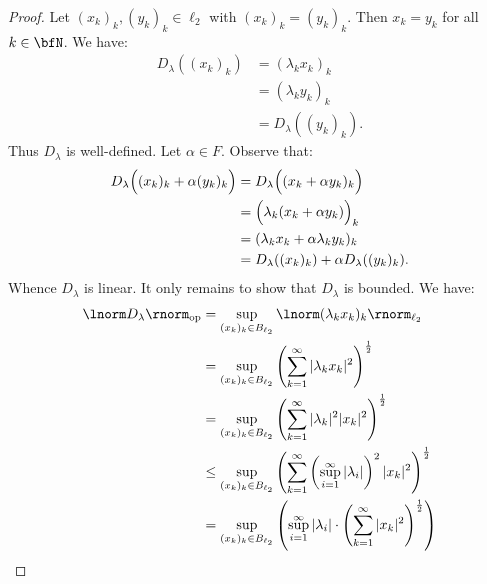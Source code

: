\documentclass[11pt,twoside,openany]{memoir}
\begin{document}
        \begin{proof}
            Let $(x_k)_k,(y_k)_k \in \ell_2$ with $(x_k)_k = (y_k)_k$. Then $x_k = y_k$ for all $k \in \bfN$. We have:
                \begin{equation*}
                \begin{split}
                    D_\lambda((x_k)_k)
                    & = (\lambda_k x_k)_k \\
                    & = (\lambda_k y_k)_k \\
                    & = D_\lambda((y_k)_k).
                \end{split}
                \end{equation*}
            Thus $D_\lambda$ is well-defined. Let $\alpha \in F$. Observe that:
                \begin{equation*}
                \begin{split}
                    D_\lambda\Bigl((x_k)_k + \alpha(y_k)_k\Bigr) 
                    & = D_\lambda \Bigl((x_k + \alpha y_k)_k \Bigr) \\
                    & = \Bigl(\lambda_k (x_k + \alpha y_k)\Bigr)_k \\
                    & = (\lambda_k x_k + \alpha \lambda_k y_k)_k \\
                    & = D_\lambda((x_k)_k) + \alpha D_\lambda((y_k)_k).
                \end{split}
                \end{equation*}
            Whence $D_\lambda$ is linear. It only remains to show that $D_\lambda$ is bounded. We have:
                \begin{equation*}
                \begin{split}
                    \lnorm D_\lambda \rnorm_\text{op}
                    & = \sup_{(x_k)_k \in B_{\ell_2}} \lnorm (\lambda_k x_k)_k \rnorm_{\ell_2} \\
                    & = \sup_{(x_k)_k \in B_{\ell_2}} \left( \sum_{k = 1}^\infty |\lambda_k x_k|^2 \right)^\frac{1}{2} \\
                    & = \sup_{(x_k)_k \in B_{\ell_2}}\left( \sum_{k = 1}^\infty |\lambda_k|^2 |x_k|^2 \right)^\frac{1}{2} \\
                    & \leq \sup_{(x_k)_k \in B_{\ell_2}}\left( \sum_{k = 1}^\infty \left( \sup_{i = 1}^\infty |\lambda_i| \right)^2 |x_k|^2 \right)^\frac{1}{2} \\
                    & = \sup_{(x_k)_k \in B_{\ell_2}} \left( \sup_{i = 1}^\infty |\lambda_i| \cdot \left( \sum_{k = 1}^\infty |x_k|^2 \right)^\frac{1}{2} \right) \\

\end{split}
\end{equation*}
\end{proof}
\end{document}
